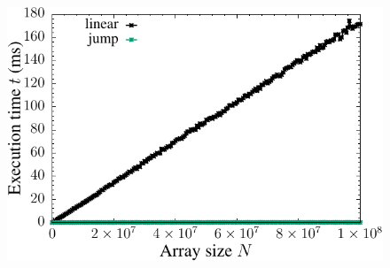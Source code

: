 \begin{figure}[H]
  \centering
  \includegraphics[scale=1.2]{../plots/lvsj_search_time.pdf}
\end{figure} \label{fig:lvsj_search_time}
